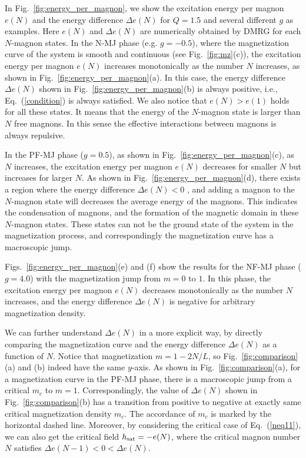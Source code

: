 \documentclass[article,10pt,onecolumn,superscriptaddress,floatfix]{revtex4}
\begin{document}
In Fig.~\ref{fig:energy_per_magnon}, we show the excitation energy per magnon $e(N)$ and the energy difference $\Delta e(N)$ for $Q=1.5$ and several different $g$ as examples. Here $e(N)$ and $\Delta e(N)$ are numerically obtained by DMRG for each $N$-magnon states. In the N-MJ phase (e.g. $g=-0.5$), where the magnetization curve of the system is smooth and continuous (see Fig.~\ref{fig:mz}(c)), the excitation energy per magnon $e(N)$ increases monotonically as the number $N$ increases, as shown in Fig.~\ref{fig:energy_per_magnon}(a).
In this case, the energy difference $\Delta e(N)$ shown in Fig.~\ref{fig:energy_per_magnon}(b) is always positive, i.e., Eq.~(\ref{condition}) is always satisfied. We also notice that $e(N)>e(1)$ holds for all these states. It means that the energy of the $N$-magnon state is larger than $N$ free magnons. In this sense the effective interactions between magnons is always repulsive.

In the PF-MJ phase ($g=0.5$), as shown in Fig.~\ref{fig:energy_per_magnon}(c), as $N$ increases, the excitation energy per magnon $e(N)$ decreases for smaller $N$ but increases for larger $N$. As shown in Fig.~\ref{fig:energy_per_magnon}(d), there exists a region where the energy difference $\Delta e(N)<0$ , and adding a magnon to the $N$-magnon state will decreases the average energy of the magnons. This indicates the condensation of magnons, and the formation of the magnetic domain in these $N$-magnon states. These states can not be the ground state of the system in the magnetization process, and correspondingly the magnetization curve has a macroscopic jump.

Figs.~\ref{fig:energy_per_magnon}(e) and (f) show the results for the NF-MJ phase ($g=4.0$) with the magnetization jump from $m=0$ to $1$. In this phase, the excitation energy per magnon $e(N)$ decreases monotonically as the number $N$ increases, and the energy difference $\Delta e(N)$ is negative for arbitrary magnetization density.

We can further understand $\Delta e(N)$ in a more explicit way, by directly comparing the magnetization curve and the energy difference $\Delta e(N)$ as a function of $N$. Notice that magnetization $m=1-2N/L$, so Fig.~\ref{fig:comparison} (a) and (b) indeed have the same $y$-axis. As shown in Fig.~\ref{fig:comparison}(a), for a magnetization curve in the PF-MJ phase, there is a macroscopic jump from a critical $m_c$ to $m=1$. Correspondingly, the value of $\Delta e(N)$ shown in Fig.~\ref{fig:comparison}(b) has a transition from positive to negative at exactly same critical magnetization density $m_{c}$. The accordance of $m_c$ is marked by the horizontal dashed line.  Moreover, by considering the critical case of Eq.~(\ref{neq11}), we can also get the critical field $h_{\rm sat}=-e(N)$, where the critical magnon number $N$ satisfies $\Delta e(N-1)<0<\Delta e(N)$.
\end{document}
